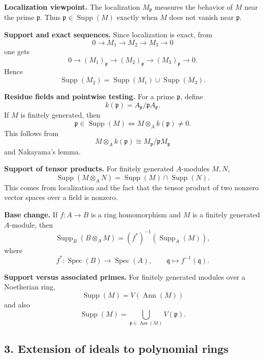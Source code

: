 \documentclass[12pt,a4paper]{article}
\theoremstyle{plain}
\theoremstyle{definition}      %
\begin{document}
	\medskip
	
	\textbf{Localization viewpoint.}
	The localization \(M_{\mathfrak p}\) measures the behavior of \(M\) near the prime \(\mathfrak p\).
	Thus \(\mathfrak p\in \operatorname{Supp}(M)\) exactly when \(M\) does not vanish near \(\mathfrak p\).
	
	\medskip
	
	\textbf{Support and exact sequences.}
	Since localization is exact, from
	\[
	0\to M_1\to M_2\to M_3\to 0
	\]
	one gets
	\[
	0\to (M_1)_{\mathfrak p}\to (M_2)_{\mathfrak p}\to (M_3)_{\mathfrak p}\to 0.
	\]
	Hence
	\[
	\operatorname{Supp}(M_2)=\operatorname{Supp}(M_1)\cup \operatorname{Supp}(M_3).
	\]
	
	\medskip
	
	\textbf{Residue fields and pointwise testing.}
	For a prime \(\mathfrak p\), define
	\[
	k(\mathfrak p)=A_{\mathfrak p}/\mathfrak p A_{\mathfrak p}.
	\]
	If \(M\) is finitely generated, then
	\[
	\mathfrak p\in \operatorname{Supp}(M)
	\iff
	M\otimes_A k(\mathfrak p)\neq 0.
	\]
	This follows from
	\[
	M\otimes_A k(\mathfrak p)\cong M_{\mathfrak p}/\mathfrak p M_{\mathfrak p}
	\]
	and Nakayama's lemma.
	
	\medskip
	
	\textbf{Support of tensor products.}
	For finitely generated \(A\)-modules \(M,N\),
	\[
	\operatorname{Supp}(M\otimes_A N)=\operatorname{Supp}(M)\cap \operatorname{Supp}(N).
	\]
	This comes from localization and the fact that the tensor product of two nonzero vector spaces over a field is nonzero.
	
	\medskip
	
	\textbf{Base change.}
	If \(f:A\to B\) is a ring homomorphism and \(M\) is a finitely generated \(A\)-module, then
	\[
	\operatorname{Supp}_B(B\otimes_A M)=(f^*)^{-1}(\operatorname{Supp}_A(M)),
	\]
	where
	\[
	f^*:\operatorname{Spec}(B)\to \operatorname{Spec}(A),\qquad
	\mathfrak q\mapsto f^{-1}(\mathfrak q).
	\]
	
	\medskip
	
	\textbf{Support versus associated primes.}
	For finitely generated modules over a Noetherian ring,
	\[
	\operatorname{Supp}(M)=V(\operatorname{Ann}(M))
	\]
	and also
	\[
	\operatorname{Supp}(M)=\bigcup_{\mathfrak p\in \operatorname{Ass}(M)}V(\mathfrak p).
	\]
	
	\subsection*{3. Extension of ideals to polynomial rings}
	
\end{document}
